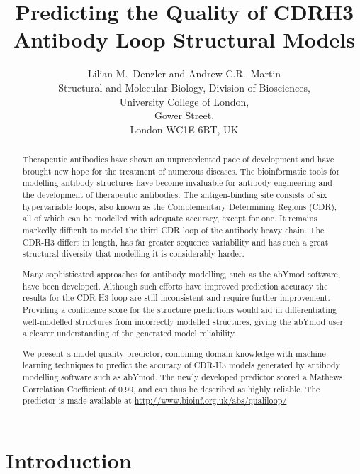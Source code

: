 \documentclass[12pt]{article}
\title{Predicting the Quality of CDRH3 Antibody Loop Structural Models}
\author{Lilian M.\ Denzler and Andrew C.R.\ Martin\\
Structural and Molecular Biology, Division of Biosciences,\\
University College of London,\\
Gower Street,\\
London WC1E 6BT, UK
}
\begin{document}
\maketitle

\begin{abstract}
  Therapeutic antibodies have shown an unprecedented pace of
  development and have brought new hope for the treatment of numerous
  diseases. The bioinformatic tools for modelling antibody structures
  have become invaluable for antibody engineering and the development
  of therapeutic antibodies. The antigen-binding site consists of six
  hypervariable loops, also known as the Complementary Determining
  Regions (CDR), all of which can be modelled with adequate accuracy,
  except for one. It remains markedly difficult to model the third CDR
  loop of the antibody heavy chain. The CDR-H3 differs in length, has
  far greater sequence variability and has such a great structural
  diversity that modelling it is considerably harder.

  Many sophisticated approaches for antibody modelling, such as the
  abYmod software, have been developed. Although such efforts have
  improved prediction accuracy the results for the CDR-H3 loop are
  still inconsistent and require further improvement. Providing a
  confidence score for the structure predictions would aid in
  differentiating well-modelled structures from incorrectly modelled
  structures, giving the abYmod user a clearer understanding of the
  generated model reliability.

  We present a model quality predictor, combining domain knowledge
  with machine learning techniques to predict the accuracy of CDR-H3
  models generated by antibody modelling software such as abYmod. The
  newly developed predictor scored a Mathews Correlation Coefficient
  of 0.99, and can thus be described as highly reliable. The predictor
  is made available at \url{http://www.bioinf.org.uk/abs/qualiloop/}
\end{abstract}

\section{Introduction}
\end{document}
